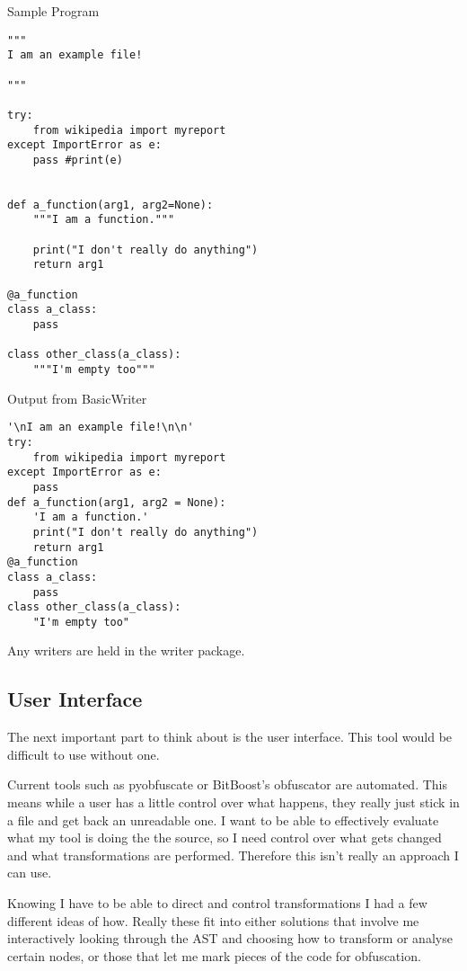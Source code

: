 \documentclass{report}
\begin{document}
\begin{minipage}[t]{0.45\linewidth}
Sample Program

\lstset{basicstyle=\tiny}
\begin{lstlisting}
"""
I am an example file!

"""

try:
    from wikipedia import myreport
except ImportError as e:
    pass #print(e)


def a_function(arg1, arg2=None):
    """I am a function."""

    print("I don't really do anything")
    return arg1

@a_function
class a_class:
    pass

class other_class(a_class):
    """I'm empty too"""
\end{lstlisting}
\end{minipage}
\hspace{0.5cm}
\begin{minipage}[t]{0.45\linewidth}
Output from BasicWriter

\lstset{basicstyle=\tiny}
\begin{lstlisting}
'\nI am an example file!\n\n'
try:
    from wikipedia import myreport
except ImportError as e:
    pass
def a_function(arg1, arg2 = None):
    'I am a function.'
    print("I don't really do anything")
    return arg1
@a_function
class a_class:
    pass
class other_class(a_class):
    "I'm empty too"
\end{lstlisting}
\end{minipage}

Any writers are held in the writer package.

\subsection{User Interface}

The next important part to think about is the user interface. This tool would be difficult to use without one.

Current tools such as pyobfuscate or BitBoost's obfuscator are automated. This means while a user has a little control
over what happens, they really just stick in a file and get back an unreadable one. I want to be able to effectively
evaluate what my tool is doing the the source, so I need control over what gets changed and what transformations are
performed. Therefore this isn't really an approach I can use.

Knowing I have to be able to direct and control transformations I had a few different ideas of how. Really these fit into
either solutions that involve me interactively looking through the AST and choosing how to transform or analyse certain
nodes, or those that let me mark pieces of the code for obfuscation.
\end{document}
